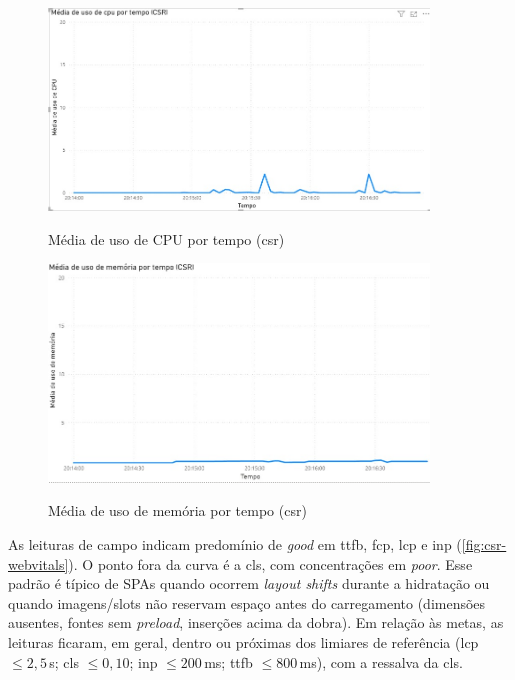 {\begin{figure}[H]
\centering
\caption{Média de uso de CPU por tempo (\acrshort{csr})}
\includegraphics[width=0.9\textwidth]{media/uso_cpu_csr.jpeg}
\label{fig:csr-cpu}
\end{figure}

\begin{figure}[H]
\centering
\caption{Média de uso de memória por tempo (\acrshort{csr})}
\includegraphics[width=0.9\textwidth]{media/uso_memoria_csr.jpeg}
\label{fig:csr-mem}
\end{figure}

As leituras de campo indicam predomínio de \textit{good} em \acrshort{ttfb}, \acrshort{fcp}, \acrshort{lcp} e \acrshort{inp} (\autoref{fig:csr-webvitals}). O ponto fora da curva é a \acrshort{cls}, com concentrações em \textit{poor}. Esse padrão é típico de SPAs quando ocorrem \emph{layout shifts} durante a hidratação ou quando imagens/slots não reservam espaço antes do carregamento (dimensões ausentes, fontes sem \emph{preload}, inserções acima da dobra). Em relação às metas, as leituras ficaram, em geral, dentro ou próximas dos limiares de referência (\acrshort{lcp} $\leq 2{,}5$\,s; \acrshort{cls} $\leq 0{,}10$; \acrshort{inp} $\leq 200$\,ms; \acrshort{ttfb} $\leq 800$\,ms), com a ressalva da \acrshort{cls}.

}
